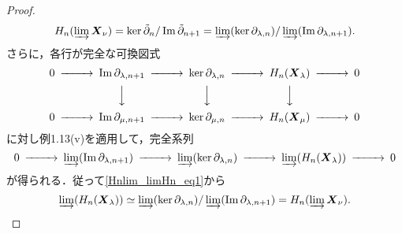 \begin{proof}
\begin{align}
    H_n (\varinjlim \boldsymbol{X}_\nu) = \ker \tilde\partial_n / \Im \tilde\partial_{n+1} = \varinjlim (\ker \partial_{\lambda, n}) / \varinjlim (\Im \partial_{\lambda, n+1}). \label{Hnlim_limHn_eq1}
  \end{align}
  さらに，各行が完全な可換図式
  \[
  \begin{CD}
    0 @>>> \Im \partial_{\lambda, n+1} @>>> \ker \partial_{\lambda, n} @>>> H_n (\boldsymbol{X}_\lambda) @>>> 0 \\
    @. @VVV  @VVV  @VVV \\
    0 @>>> \Im \partial_{\mu, n+1} @>>> \ker \partial_{\mu, n} @>>> H_n (\boldsymbol{X}_\mu) @>>> 0
  \end{CD}
  \]
  に対し例1.13(v)を適用して，完全系列
  \[
  \begin{CD}
    0 @>>> \varinjlim (\Im \partial_{\lambda, n+1}) @>>> \varinjlim (\ker \partial_{\lambda, n}) @>>> \varinjlim (H_n(\boldsymbol{X}_\lambda)) @>>> 0
  \end{CD}
  \]
  が得られる．従って\eqref{Hnlim_limHn_eq1}から
  \[ \varinjlim (H_n(\boldsymbol{X}_\lambda)) \simeq \varinjlim (\ker \partial_{\lambda, n}) / \varinjlim (\Im \partial_{\lambda, n+1}) = H_n (\varinjlim \boldsymbol{X}_\nu). \]
\end{proof}
